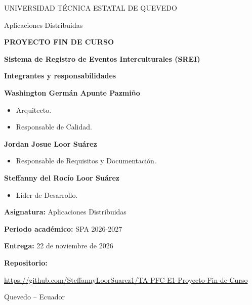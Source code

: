 \documentclass[12pt,a4paper]{article}
\begin{document}
\begin{titlepage}
    \centering

    \vspace*{1cm}

    {\Large UNIVERSIDAD TÉCNICA ESTATAL DE QUEVEDO\par}

    \vspace{0.5cm}

    {\large Aplicaciones Distribuidas\par}

    \vspace{2cm}

    {\Large\bfseries PROYECTO FIN DE CURSO\par}

    \vspace{0.8cm}

    {\LARGE\bfseries Sistema de Registro de Eventos
    Interculturales (SREI)\par}

    \vspace{1.5cm}

    {\large\bfseries Integrantes y responsabilidades\par}

    \vspace{0.5cm}

    \begin{flushleft}
    \textbf{Washington Germán Apunte Pazmiño}
    \begin{itemize}
        \item Arquitecto.
        \item Responsable de Calidad.
    \end{itemize}

    \textbf{Jordan Josue Loor Suárez}
\begin{itemize}
    \item Responsable de Requisitos y Documentación.
\end{itemize}

    \textbf{Steffanny del Rocío Loor Suárez}
    \begin{itemize}
        \item Líder de Desarrollo.
    \end{itemize}
    \end{flushleft}

    \vfill

    \textbf{Asignatura:} Aplicaciones Distribuidas

    \textbf{Periodo académico:} SPA 2026-2027

    \textbf{Entrega:} 22 de noviembre de 2026

    \vspace{0.5cm}

    \textbf{Repositorio:}

    \url{https://github.com/SteffannyLoorSuarez1/TA-PFC-E1-Proyecto-Fin-de-Curso}

    \vspace{1cm}

    Quevedo -- Ecuador

\end{titlepage}


\tableofcontents
\newpage







\newpage
\printbibliography[title={Referencias bibliográficas}]
\end{document}
